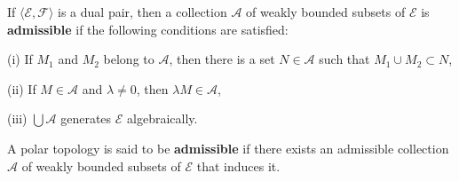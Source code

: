 If $\langle \mathcal{E}, \mathcal{F} \rangle$ is a dual pair, then a collection $\mathcal{A}$ of weakly bounded subsets of $\mathcal{E}$ is \textbf{admissible} if the following conditions are satisfied:

(i) If $M_1$ and $M_2$ belong to $\mathcal{A}$, then there is a set $N \in \mathcal{A}$ such that $M_1 \cup M_2 \subset N$,

(ii) If $M \in \mathcal{A}$ and $\lambda \neq 0$, then $\lambda M \in \mathcal{A}$,

(iii) $\bigcup \mathcal{A}$ generates $\mathcal{E}$ algebraically.

A polar topology is said to be \textbf{admissible} if there exists an admissible collection $\mathcal{A}$ of weakly bounded subsets of $\mathcal{E}$ that induces it.

